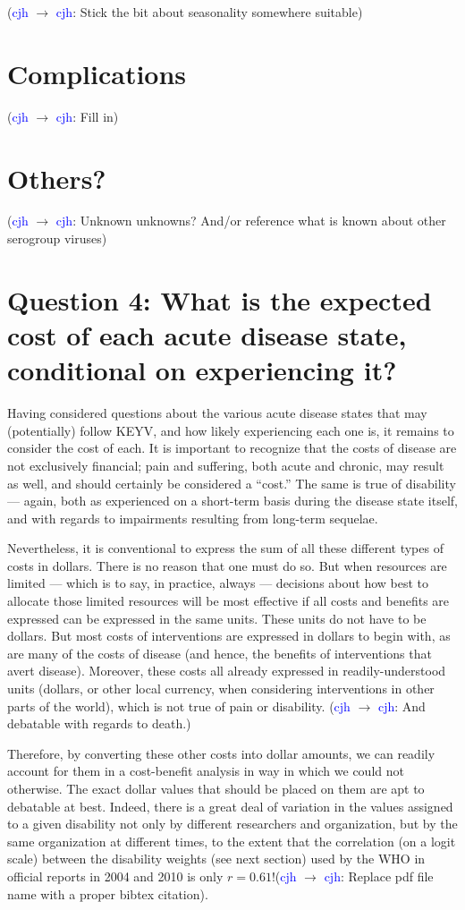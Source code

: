 \documentclass[12pt]{article}
\newcommand{\cjh}{\textcolor{blue}{cjh}}
\newcommand{\msg}[3]{(#1 $\rightarrow$ #2: #3)}
\newcommand{\mcc}[1]{\msg\cjh\cjh{#1}}
\begin{document}
            \mcc{Stick the bit about seasonality somewhere suitable}

        \section{Complications}
            \mcc{Fill in}

        \section{Others?}
            \mcc{Unknown unknowns? And/or reference what is known about other serogroup viruses}

    \section[Expected costs, given diseases]{Question 4: What is the expected cost of each acute disease state, conditional on experiencing it?}
        Having considered questions about the various acute disease states that may (potentially) follow KEYV, and how likely experiencing each one is, it remains to consider the cost of each. It is important to recognize that the costs of disease are not exclusively financial; pain and suffering, both acute and chronic, may result as well, and should certainly be considered a ``cost.'' The same is true of disability --- again, both as experienced on a short-term basis during the disease state itself, and with regards to impairments resulting from long-term sequelae.

        Nevertheless, it is conventional to express the sum of all these different types of costs in dollars. There is no reason that one must do so. But when resources are limited --- which is to say, in practice, always --- decisions about how best to allocate those limited resources will be most effective if all costs and benefits are expressed can be expressed in the same units. These units do not have to be dollars. But most costs of interventions are expressed in dollars to begin with, as are many of the costs of disease (and hence, the benefits of interventions that avert disease). Moreover, these costs all already expressed in readily-understood units (dollars, or other local currency, when considering interventions in other parts of the world), which is not true of pain or disability. \mcc{And debatable with regards to death.} 
        
        Therefore, by converting these other costs into dollar amounts, we can readily account for them in a cost-benefit analysis in way in which we could not otherwise. The exact dollar values that should be placed on them are apt to debatable at best. Indeed, there is a great deal of variation in the values assigned to a given disability not only by different researchers and organization, but by the same organization at different times, to the extent that the correlation (on a logit scale) between the disability weights (see next section) used by the WHO in official reports in 2004 and 2010 is only $r = 0.61$!\cite{GlobalDALYmethods_2000_2011}\mcc{Replace pdf file name with a proper bibtex citation}.
\end{document}
